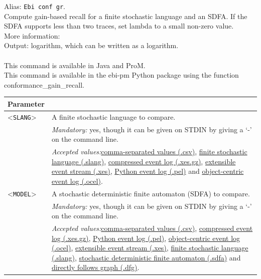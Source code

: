 {Alias: \texttt{Ebi conf gr}.\\
Compute gain-based recall for a finite stochastic language and an SDFA. If the SDFA supports less than two traces, set lambda to a small non-zero value.\\
More information: \cite{DBLP:journals/is/LeemansP23}~\\
\noindent Output: logarithm, which can be written as a logarithm.\\
\\This command is available in Java and ProM.
\\This command is available in the ebi-pm Python package using the function conformance\_gain\_recall.
\begin{tabularx}{\linewidth}{lX}
\toprule
Parameter \\\midrule
<\texttt{SLANG}>&A finite stochastic language to compare.\\
&\textit{Mandatory:} \quad yes, though it can be given on STDIN by giving a `-' on the command line.\\
&\textit{Accepted values:}\quad \hyperref[filehandler:comma-separated values]{comma-separated values (.csv)}, \hyperref[filehandler:finite stochastic language]{finite stochastic language (.slang)}, \hyperref[filehandler:compressed event log]{compressed event log (.xes.gz)}, \hyperref[filehandler:extensible event stream]{extensible event stream (.xes)}, \hyperref[filehandler:Python event log]{Python event log (.pel)} and \hyperref[filehandler:object-centric event log]{object-centric event log (.ocel)}.\\
<\texttt{MODEL}>&A stochastic deterministic finite automaton (SDFA) to compare.\\
&\textit{Mandatory:} \quad yes, though it can be given on STDIN by giving a `-' on the command line.\\
&\textit{Accepted values:}\quad \hyperref[filehandler:comma-separated values]{comma-separated values (.csv)}, \hyperref[filehandler:compressed event log]{compressed event log (.xes.gz)}, \hyperref[filehandler:Python event log]{Python event log (.pel)}, \hyperref[filehandler:object-centric event log]{object-centric event log (.ocel)}, \hyperref[filehandler:extensible event stream]{extensible event stream (.xes)}, \hyperref[filehandler:finite stochastic language]{finite stochastic language (.slang)}, \hyperref[filehandler:stochastic deterministic finite automaton]{stochastic deterministic finite automaton (.sdfa)} and \hyperref[filehandler:directly follows graph]{directly follows graph (.dfg)}.\\

\end{tabularx}}
